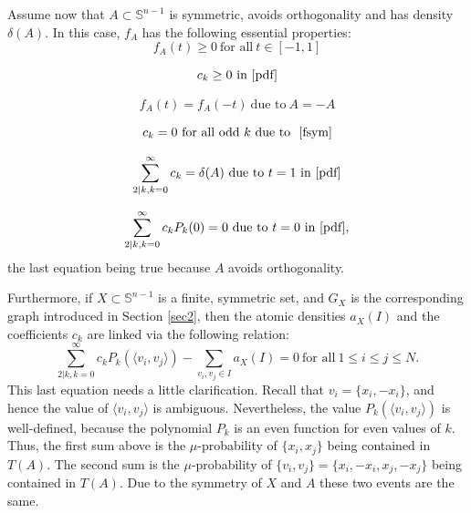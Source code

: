 \documentclass[11pt]{amsart}
\numberwithin{equation}{section}
\newcommand{\Sp}{\mathbb S}
\begin{document}
\medskip

Assume now that $A\subset \Sp^{n-1}$ is symmetric, avoids orthogonality and has density $\delta(A)$. In this case, $f_A$ has the following essential properties: 
\begin{equation}\label{fpos}
f_A(t)\ge 0 \ {\textrm{for all}} \ t\in[-1,1]    
\end{equation}

\begin{equation}\label{cpos}
c_k\ge 0 \ {\textrm{in}} \  \eqref{pdf}    
\end{equation}

\begin{equation}\label{fsym}
f_A(t)=f_A(-t) \ {\textrm{due to}} \ A=-A    
\end{equation}

\begin{equation}\label{codd}
c_k=0 \ {\textrm{for all odd}} \ k  \ {\textrm{due to }} \ \eqref{fsym}     
\end{equation}

\begin{equation}\label{t1}
\sum_{2|k, k=0}^\infty c_k=\delta(A)  \ {\textrm{due to}} \ t=1 \ {\textrm{in}} \ \eqref{pdf}   
\end{equation}

\begin{equation}\label{t0}
\sum_{2|k, k=0}^\infty c_kP_k(0)=0  \ {\textrm{due to}} \ t=0 \ {\textrm{in}} \ \eqref{pdf},  
\end{equation}
the last equation being true because $A$ avoids orthogonality. 

Furthermore, if $X\subset \Sp^{n-1}$ is a finite, symmetric set, and $G_X$ is the corresponding graph introduced in Section \ref{sec2}, then the atomic densities $a_X(I)$ and the coefficients $c_k$ are linked via the following relation: 
\begin{equation}\label{axck}
\sum_{2|k, k=0}^\infty c_kP_k(\langle v_i, v_j \rangle) - \sum_{v_i,v_j\in I} a_X(I) =0 \ {\textrm{for all}} \ 1\le i\le j\le N.
\end{equation}
This last equation needs a little clarification. Recall that $v_i=\{x_i, -x_i\}$, and hence the value of $\langle v_i, v_j \rangle$ is ambiguous. Nevertheless, the value $P_k(\langle v_i, v_j \rangle)$ is well-defined, because the polynomial $P_k$ is an even function for even values of $k$. Thus, the first sum above is the $\mu$-probability of $\{x_i, x_j\}$ being contained in $T(A)$.  The second sum is the $\mu$-probability of $\{v_i, v_j\}=\{x_i, -x_i, x_j, -x_j\}$ being contained in $T(A)$. Due to the symmetry of $X$ and $A$ these two events are the same. 
\end{document}
